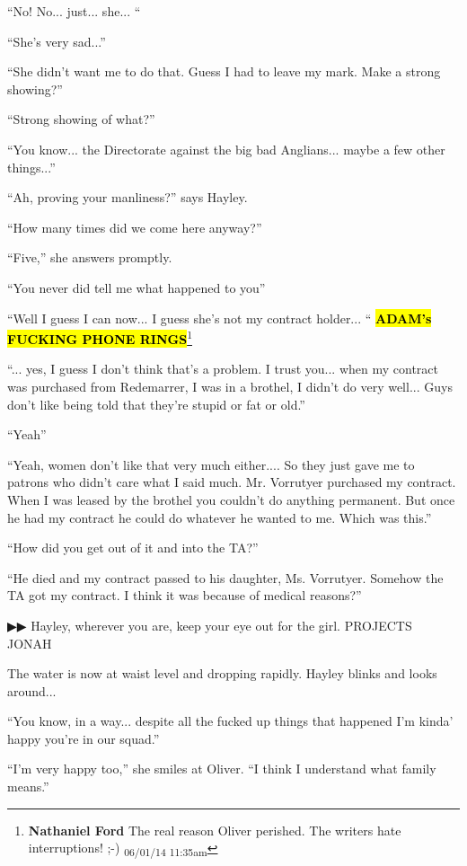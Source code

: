 ``No! No... just... she... ``

``She's very sad...''

``She didn't want me to do that.  Guess I had to leave my mark.  Make a strong showing?''

``Strong showing of what?''

``You know... the Directorate against the big bad Anglians... maybe a few other things...''

``Ah, proving your manliness?'' says Hayley.

``How many times did we come here anyway?''

``Five,'' she answers promptly.

``You never did tell me what happened to you''

``Well I guess I can now... I guess she's not my contract holder... ``
\textbf{\hl{ADAM's FUCKING PHONE RINGS}}\footnote{\textbf{Nathaniel Ford }The real reason Oliver perished. The writers hate interruptions! ;-) \textsubscript{06/01/14 11:35am}}

``... yes, I guess I don't think that's a problem.  I trust you... when my contract was purchased from Redemarrer, I was in a brothel, I didn't do very well... Guys don't like being told that they're stupid or fat or old.''

``Yeah''

``Yeah, women don't like that very much either.... So they just gave me to patrons who didn't care what I said much.  Mr. Vorrutyer purchased my contract.  When I was leased by the brothel you couldn't do anything permanent.  But once he had my contract he could do whatever he wanted to me.  Which was this.''

``How did you get out of it and into the TA?''

``He died and my contract passed to his daughter, Ms. Vorrutyer.  Somehow the TA got my contract.  I think it was because of medical reasons?''



 {\color[RGB]{68,68,68}▶▶}  Hayley, wherever you are, keep your eye out for the girl.  PROJECTS JONAH



The water is now at waist level and dropping rapidly.  Hayley blinks and looks around... 

``You know, in a way... despite all the fucked up things that happened I'm kinda' happy you're in our squad.''

``I'm very happy too,'' she smiles at Oliver.  ``I think I understand what family means.''

